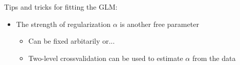\documentclass[svgnames,13pt,handout]{beamer}
\begin{document}
\begin{frame}{Tips and tricks for fitting the GLM:}
\begin{itemize}
	\item The strength of regularization $\alpha$ is another free parameter
	\begin{itemize}
		\item Can be fixed arbitarily or...
		\item Two-level crossvalidation can be used to estimate $\alpha$ from the data
	\end{itemize}
\end{itemize}
\end{frame} 


\appendix{}
\setcounter{finalframe}{\value{framenumber}}
\setcounter{framenumber}{\value{finalframe}}
\end{document}
